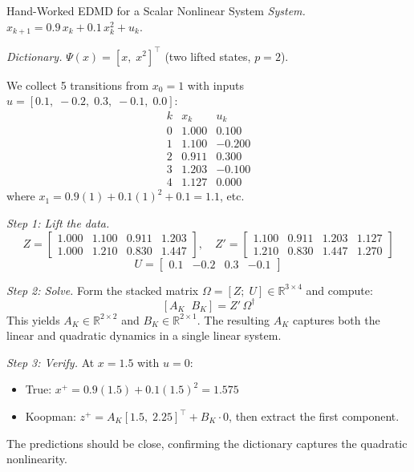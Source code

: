 \begin{examplebox}{Hand-Worked EDMD for a Scalar Nonlinear System}
	\emph{System.} $x_{k+1} = 0.9\,x_k + 0.1\,x_k^2 + u_k$.

	\emph{Dictionary.} $\Psi(x) = [x, \; x^2]^\top$ (two lifted states, $p = 2$).

	We collect 5 transitions from $x_0 = 1$ with inputs $u = [0.1,\; -0.2,\; 0.3,\; -0.1,\; 0.0]$:
	\[
	\begin{array}{c|c|c}
		k & x_k & u_k \\ \hline
		0 & 1.000 & 0.100 \\
		1 & 1.100 & -0.200 \\
		2 & 0.911 & 0.300 \\
		3 & 1.203 & -0.100 \\
		4 & 1.127 & 0.000
	\end{array}
	\]
	where $x_1 = 0.9(1) + 0.1(1)^2 + 0.1 = 1.1$, etc.

	\solution

	\emph{Step 1: Lift the data.}
	\[
	Z = \begin{bmatrix} 1.000 & 1.100 & 0.911 & 1.203 \\ 1.000 & 1.210 & 0.830 & 1.447 \end{bmatrix}, \quad
	Z' = \begin{bmatrix} 1.100 & 0.911 & 1.203 & 1.127 \\ 1.210 & 0.830 & 1.447 & 1.270 \end{bmatrix}
	\]
	\[
	U = \begin{bmatrix} 0.1 & -0.2 & 0.3 & -0.1 \end{bmatrix}
	\]

	\emph{Step 2: Solve.} Form the stacked matrix $\Omega = [Z;\; U] \in \mathbb{R}^{3 \times 4}$ and compute:
	\[
	[A_K \;\; B_K] = Z'\,\Omega^\dagger
	\]
	This yields $A_K \in \mathbb{R}^{2 \times 2}$ and $B_K \in \mathbb{R}^{2 \times 1}$. The resulting $A_K$ captures both the linear and quadratic dynamics in a single linear system.

	\emph{Step 3: Verify.} At $x = 1.5$ with $u = 0$:
	\begin{itemize}[noitemsep]
		\item True: $x^+ = 0.9(1.5) + 0.1(1.5)^2 = 1.575$
		\item Koopman: $z^+ = A_K [1.5,\; 2.25]^\top + B_K \cdot 0$, then extract the first component.
	\end{itemize}
	The predictions should be close, confirming the dictionary captures the quadratic nonlinearity.
\end{examplebox}


